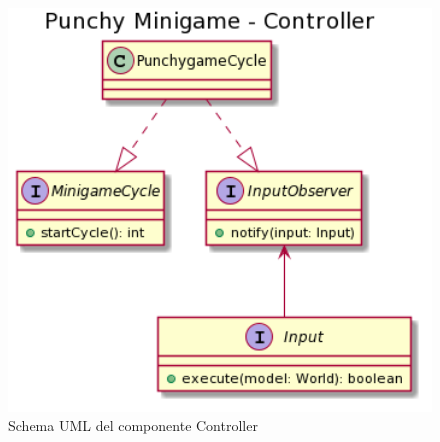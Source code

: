 \documentclass[a4paper,12pt]{report}
\begin{document}
    \begin{figure}[!t]
        \centering{}
        \includegraphics[width=150mm]{images/picchiotti/punchycontroller.png}
        \caption{Schema UML del componente Controller}
        \label{img:punchycontroller}
    \end{figure}
\end{document}
